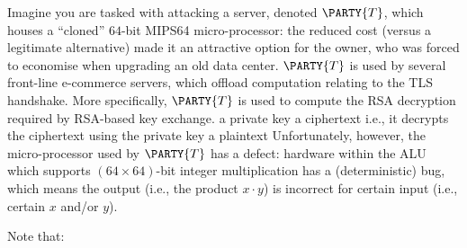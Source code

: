 %



Imagine you are tasked with attacking a server, denoted 
$\PARTY{T}$, 
which houses a ``cloned'' $64$-bit MIPS64 micro-processor: the reduced cost 
(versus a legitimate alternative) 
made it an attractive option for the owner, who was forced to economise when
upgrading an old data center.
$\PARTY{T}$ 
is used by several front-line e-commerce servers, which offload computation 
relating to the TLS handshake.  More specifically, 
$\PARTY{T}$ 
is used to compute the RSA decryption required by RSA-based key exchange.
\DESCINTRO[none]
{}
{a private key}
{a ciphertext}
{i.e., it decrypts the ciphertext using the private key}
{a  plaintext}
Unfortunately, however, the micro-processor used by 
$\PARTY{T}$ 
has a defect: hardware within the ALU which supports $( 64 \times 64 )$-bit 
integer multiplication has a (deterministic) bug, which means
the    output (i.e., the product $x \cdot y$)
is incorrect for 
certain input (i.e., certain $x$ and/or $y$).




%
Note that:

